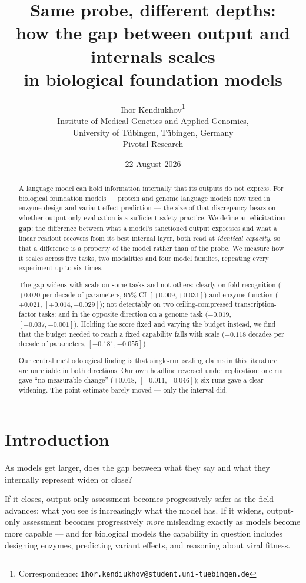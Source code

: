 \documentclass[11pt]{article}
\title{\bfseries Same probe, different depths:\\[3pt]
\large how the gap between output and internals scales\\[1pt]
in biological foundation models}
\author{%
  Ihor Kendiukhov\thanks{Correspondence:
  \texttt{ihor.kendiukhov@student.uni-tuebingen.de}}\\[2pt]
  \normalsize Institute of Medical Genetics and Applied Genomics,\\
  \normalsize University of T\"ubingen, T\"ubingen, Germany\\[2pt]
  \normalsize Pivotal Research
}
\date{22 August 2026}
\begin{document}
\maketitle

\begin{abstract}
\noindent
A language model can hold information internally that its outputs do not
express. For biological foundation models --- protein and genome language models
now used in enzyme design and variant effect prediction --- the size of that
discrepancy bears on whether output-only evaluation is a sufficient safety
practice. We define an \textbf{elicitation gap}: the difference between what a
model's sanctioned output expresses and what a linear readout recovers from its
best internal layer, both read at \emph{identical capacity}, so that a difference
is a property of the model rather than of the probe. We measure how it scales
across five tasks, two modalities and four model families, repeating every
experiment up to six times.

The gap widens with scale on some tasks and not others: clearly on fold
recognition ($+0.020$ per decade of parameters, 95\% CI $[+0.009, +0.031]$) and
enzyme function ($+0.021$, $[+0.014, +0.029]$); not detectably on two
ceiling-compressed transcription-factor tasks; and in the opposite direction on a
genome task ($-0.019$, $[-0.037, -0.001]$). Holding the score fixed and varying
the budget instead, we find that the budget needed to reach a fixed capability
falls with scale ($-0.118$ decades per decade of parameters, $[-0.181, -0.055]$).

Our central methodological finding is that single-run scaling claims in this
literature are unreliable in both directions. Our own headline reversed under
replication: one run gave ``no measurable change'' ($+0.018$, $[-0.011,
+0.046]$); six runs gave a clear widening. The point estimate barely moved ---
only the interval did.
\end{abstract}

\section{Introduction}

As models get larger, does the gap between what they say and what they internally
represent widen or close?

If it closes, output-only assessment becomes progressively safer as the field
advances: what you see is increasingly what the model has. If it widens,
output-only assessment becomes progressively \emph{more} misleading exactly as
models become more capable --- and for biological models the capability in
question includes designing enzymes, predicting variant effects, and reasoning
about viral fitness.
\end{document}
